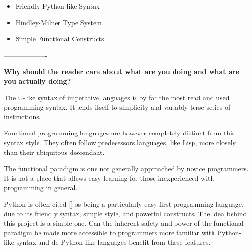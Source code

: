 \documentclass{l4proj}
\begin{document}
\begin{itemize}
    \item Friendly Python-like Syntax
    \item Hindley-Milner Type System
    \item Simple Functional Constructs
\end{itemize}



-------------------

\textbf{Why should the reader care about what are you doing and what are you actually doing?}

The C-like syntax of imperative languages is by far the most read and used programming syntax.
It lends itself to simplicity and variably terse series of instructions.

Functional programming languages are however completely distinct from this syntax style.
They often follow predecessors languages, like Lisp, more closely than their ubiquitous descendant.

The functional paradigm is one not generally approached by novice programmers.
It is not a place that allows easy learning for those inexperienced with programming in general.

Python is often cited [] as being a particularly easy first programming language, due to its friendly syntax, simple style, and powerful constructs.
The idea behind this project is a simple one.
Can the inherent safety and power of the functional paradigm be made more accessible to programmers more familiar with Python-like syntax and do Python-like languages benefit from these features.



\end{document}
